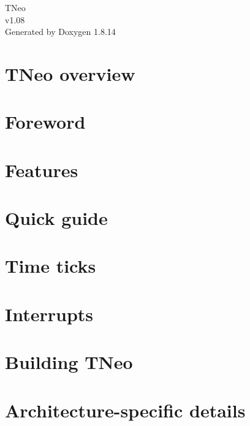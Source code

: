 \documentclass[twoside]{book}
\newcommand{\+}{\discretionary{\mbox{\scriptsize$\hookleftarrow$}}{}{}}
\newcommand{\clearemptydoublepage}{%
  \newpage{\pagestyle{empty}\cleardoublepage}%
}
\begin{document}
\hypersetup{pageanchor=false,
             bookmarksnumbered=true,
             pdfencoding=unicode
            }
\begin{titlepage}
\vspace*{7cm}
\begin{center}%
{\Large T\+Neo \\[1ex]\large v1.\+08 }\\
\vspace*{1cm}
{\large Generated by Doxygen 1.8.14}\\
\end{center}
\end{titlepage}
\clearemptydoublepage
{}
\tableofcontents
\clearemptydoublepage
{}
\hypersetup{pageanchor=true}

\chapter{T\+Neo overview}
\label{index}\hypertarget{index}{}
\chapter{Foreword}
\label{foreword}

\chapter{Features}
\label{features}

\chapter{Quick guide}
\label{quick_guide}

\chapter{Time ticks}
\label{time_ticks}

\chapter{Interrupts}
\label{interrupts}

\chapter{Building T\+Neo}
\label{building}

\chapter{Architecture-\/specific details}
\label{arch_specific}

\end{document}
